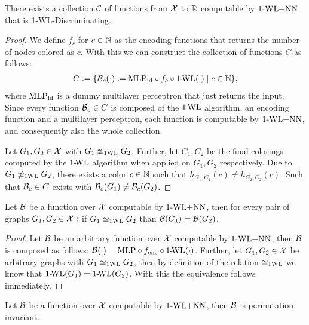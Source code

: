 \begin{lemma}\label{lem:wl_disc_exists}
    There exists a collection $\mathcal{C}$ of functions from $\mathcal{X}$ to $\mathbb{R}$ computable by $\text{1-WL+NN}$ that is 1-\!WL-Discriminating.
\end{lemma}

\begin{proof}
    We define $f_c$  for $c \in \mathbb{N}$ as the encoding functions that returns the number of nodes colored as $c$. With this we can construct the collection of functions $C$ as follows:
    \begin{align*}
        C := \{ \mathcal{B}_c(\cdot) := \text{MLP}_\text{id} \circ f_c \circ \text{1-\!WL}(\cdot) \mid c \in \mathbb{N}\},
    \end{align*}
    where $\text{MLP}_\text{id}$ is a dummy multilayer perceptron that just returns the input. Since every function $\mathcal{B}_c \in C$ is composed of the $\text{1-\!WL}$ algorithm, an encoding function and a multilayer perceptron, each function is computable by $\text{1-WL+NN}$, and consequently also the whole collection.

    Let $G_1, G_2 \in \mathcal{X}$ with $G_1 \not\simeq_{\text{1WL}} G_2$. Further, let $C_1, C_2$ be the final colorings computed by the $\text{1-\!WL}$ algorithm when applied on $G_1, G_2$
    respectively. Due to $G_1 \not\simeq_{\text{1WL}} G_2$, there exists a color $c \in \mathbb{N}$ such that $h_{G_1,C_1}(c)  \neq h_{G_2,C_2}(c)$. Such that $\mathcal{B}_c \in C$ exists with $\mathcal{B}_c(G_1) \neq \mathcal{B}_c(G_2)$.
\end{proof}

\begin{lemma}\label{lem:wl_relation_equivalence}
    Let $\mathcal{B}$ be a function over $\mathcal{X}$ computable by $\text{1-WL+NN}$, then for every pair of graphs $G_1, G_2 \in \mathcal{X}:$ if $G_1 \simeq_{\text{1WL}} G_2$ than $\mathcal{B}(G_1) = \mathcal{B}(G_2)$.
\end{lemma}

\begin{proof}
    Let $\mathcal{B}$ be an arbitrary function over $\mathcal{X}$ computable by $\text{1-WL+NN}$, then $\mathcal{B}$ is composed as follows: $\mathcal{B}(\cdot) = \text{MLP} \circ f_{\text{enc}} \circ \text{1-\!WL}(\cdot)$. Further, let $G_1, G_2 \in \mathcal{X}$ be arbitrary graphs with $G_1 \simeq_{\text{1WL}} G_2$, then by definition of the relation $\simeq_{\text{1WL}}$ we know that $\text{1-\!WL}(G_1) = \text{1-\!WL}(G_2)$. With this the equivalence follows immediately.
\end{proof}

\begin{lemma}\label{lem:wlnn_permutation_invariance}
    Let $\mathcal{B}$ be a function over $\mathcal{X}$ computable by $\text{1-WL+NN}$, then $\mathcal{B}$ is permutation invariant.
\end{lemma}

